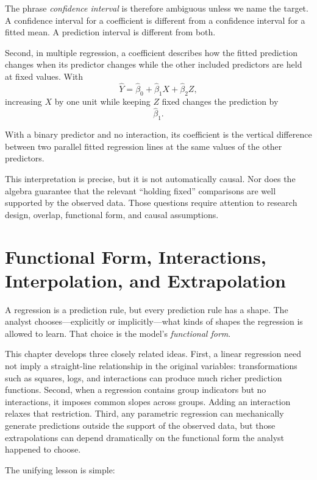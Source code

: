 \documentclass[11pt]{report}
\begin{document}
The phrase \emph{confidence interval} is therefore ambiguous unless we name the target. A confidence interval for a coefficient is different from a confidence interval for a fitted mean. A prediction interval is different from both.

Second, in multiple regression, a coefficient describes how the fitted prediction changes when its predictor changes while the other included predictors are held at fixed values. With
\[
\widehat{Y}
=
\widehat{\beta}_0+\widehat{\beta}_1X+\widehat{\beta}_2Z,
\]
increasing \(X\) by one unit while keeping \(Z\) fixed changes the prediction by
\[
\widehat{\beta}_1.
\]

With a binary predictor and no interaction, its coefficient is the vertical difference between two parallel fitted regression lines at the same values of the other predictors.

This interpretation is precise, but it is not automatically causal. Nor does the algebra guarantee that the relevant ``holding fixed'' comparisons are well supported by the observed data. Those questions require attention to research design, overlap, functional form, and causal assumptions.


\chapter{Functional Form, Interactions, Interpolation, and Extrapolation}
\label{chap:functional_form}

A regression is a prediction rule, but every prediction rule has a shape. The analyst chooses---explicitly or implicitly---what kinds of shapes the regression is allowed to learn. That choice is the model's \emph{functional form}.

This chapter develops three closely related ideas. First, a linear regression need not imply a straight-line relationship in the original variables: transformations such as squares, logs, and interactions can produce much richer prediction functions. Second, when a regression contains group indicators but no interactions, it imposes common slopes across groups. Adding an interaction relaxes that restriction. Third, any parametric regression can mechanically generate predictions outside the support of the observed data, but those extrapolations can depend dramatically on the functional form the analyst happened to choose.

The unifying lesson is simple:
\end{document}

